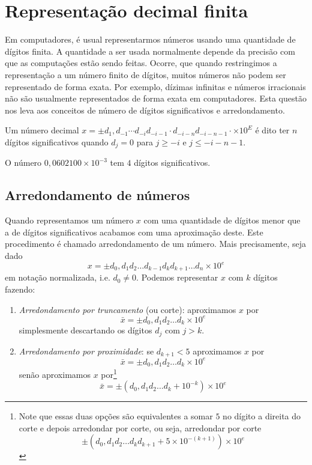 \section{Representação decimal finita}

Em computadores, é usual representarmos números usando uma quantidade de dígitos finita. A quantidade a ser usada normalmente depende da precisão com que as computações estão sendo feitas. Ocorre, que quando restringimos a representação a um número finito de dígitos, muitos números não podem ser representado de forma exata. Por exemplo, dízimas infinitas e números irracionais não são usualmente representados de forma exata em computadores. Esta questão nos leva aos conceitos de número de dígitos significativos e arredondamento.

\begin{defn} Um número decimal $x = \pm d_1,d_{-1}\cdots d_{-i}d_{-i-1}\cdot d_{-i-n} d_{-i-n-1}\cdot \times 10^E$ é dito ter $n$ dígitos significativos quando $d_{j}=0$ para $j\geq -i$ e $j\leq-i-n-1$.  
\end{defn}

\begin{ex} O número $0,0602100\times 10^{-3}$ tem $4$ dígitos significativos.
\end{ex}

\subsection{Arredondamento de números}

Quando representamos um número $x$ com uma quantidade de dígitos menor que a de dígitos significativos acabamos com uma aproximação deste. Este procedimento é chamado arredondamento de um número. Mais precisamente, seja dado
\begin{equation*}
  x = \pm d_0,d_1d_2\ldots d_{k-1}d_kd_{k+1}\ldots d_n \times 10^e
\end{equation*}
em notação normalizada, i.e. $d_0\neq 0$. Podemos representar $x$ com $k$ dígitos fazendo:
\begin{enumerate}
\item \emph{Arredondamento por truncamento} (ou corte): aproximamos $x$ por
$$
  \bar{x} = \pm d_{0},d_{1}d_{2}\ldots d_{k}\times 10^e
$$
simplesmente descartando os dígitos $d_{j}$ com $j > k$.
\item \emph{Arredondamento por proximidade}: se $d_{k+1}<5$ aproximamos $x$ por
$$
  \bar{x} = \pm d_0,d_1d_2\ldots d_{k}\times 10^{e}
$$
senão aproximamos $x$ por\footnote{Note que essas duas opções são equivalentes a somar $5$ no dígito a direita do corte e depois arredondar por corte, ou seja, arredondar por corte 
$$ \pm(d_0,d_1d_2\ldots d_kd_{k+1}+ 5 \times10^{-(k+1)} )\times 10^{e} $$}
$$
 \bar{x} = \pm(d_0,d_1d_2\ldots d_{k} + 10^{-k}) \times 10^{e}
$$
\end{enumerate}

